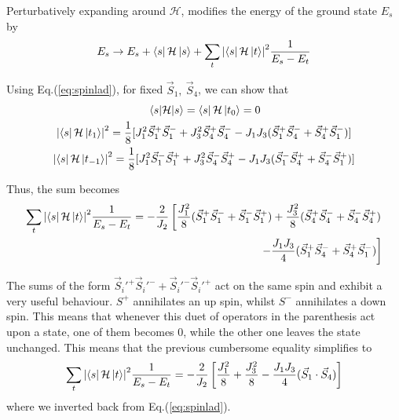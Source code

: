 \documentclass[../main.tex]{subfiles}
\begin{document}
Perturbatively expanding around $\mathcal{H}$, modifies the energy of the ground state $E_{s}$ by
\begin{equation}
\label{eq:Pert}
    E_{s}\rightarrow E_{s}+\bra{s}\mathcal{H}\ket{s}+\sum_{t}\abs{\bra{s}\mathcal{H}\ket{t}}^{2}\frac{1}{E_{s}-E_{t}}
\end{equation}

Using Eq.(\ref{eq:spinlad}), for fixed $\vec{S}_{1},\ \vec{S}_{4}$, we can show that 
\begin{equation}
\begin{gathered}
\expval{\mathcal{H}}{s} = \bra{s}\mathcal{H}\ket{t_{0}} = 0\\
\abs{\bra{s}\mathcal{H}\ket{t_{1}}}^{2} = \frac{1}{8}[J_{1}^{2}\vec{S}_{1}^{+}\vec{S}_{1}^{-} + J_{3}^{2}\vec{S}_{4}^{+}\vec{S}_{4}^{-} - J_{1}J_{3}(\vec{S}_{1}^{+}\vec{S}_{4}^{-} + \vec{S}_{4}^{+}\vec{S}_{1}^{-})] \\
\abs{\bra{s}\mathcal{H}\ket{t_{-1}}}^{2} = \frac{1}{8}[J_{1}^{2}\vec{S}_{1}^{-}\vec{S}_{1}^{+} + J_{3}^{2}\vec{S}_{4}^{-}\vec{S}_{4}^{+} - J_{1}J_{3}(\vec{S}_{1}^{-}\vec{S}_{4}^{+} + \vec{S}_{4}^{-}\vec{S}_{1}^{+})] \\
\end{gathered}
\end{equation}

Thus, the sum becomes
\begin{equation}
\begin{split}
    \sum_{t}\abs{\bra{s}\mathcal{H}\ket{t}}^{2}\frac{1}{E_{s}-E_{t}} = 
    -\frac{2}{J_{2}} \left[\frac{J_{1}^{2}}{8}(\vec{S}_{1}^{+}\vec{S}_{1}^{-} + \vec{S}_{1}^{-}\vec{S}_{1}^{+}) + \frac{J_{3}^{2}}{8}(\vec{S}_{4}^{+}\vec{S}_{4}^{-} + \vec{S}_{4}^{-}\vec{S}_{4}^{+})\right.\\ \left.-\frac{J_{1}J_{3}}{4}(\vec{S}_{1}^{+}\vec{S}_{4}^{-} + \vec{S}_{4}^{+}\vec{S}_{1}^{-})\right]
    \end{split}
\end{equation}

The sums of the form $\vec{S}_{i}'^{+}\vec{S}_{i}'^{-} + \vec{S}_{i}'^{-}\vec{S}_{i}'^{+}$ act on the same spin and exhibit a very useful behaviour. $S^{+}$ annihilates an up spin, whilst $S^{-}$ annihilates a down spin. This means that whenever this duet of operators in the parenthesis act upon a state, one of them becomes 0, while the other one leaves the state unchanged. This means that the previous cumbersome equality simplifies to
\begin{equation}
    \sum_{t}\abs{\bra{s}\mathcal{H}\ket{t}}^{2}\frac{1}{E_{s}-E_{t}} =  -\frac{2}{J_{2}}\left[\frac{J_{1}^{2}}{8} + \frac{J_{3}^{2}}{8} -\frac{J_{1}J_{3}}{4}(\vec{S}_{1}\cdot\vec{S}_{4})\right]
\end{equation}
where we inverted back from Eq.(\ref{eq:spinlad}).\\
\end{document}
